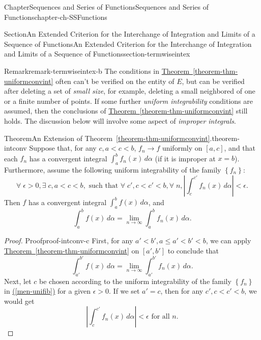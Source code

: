 \documentclass[oneside,10pt,]{book}
\newcommand{\xreffont}{\relax}
\numberwithin{equation}{section}
\begin{document}
\begin{chapterptx}{Chapter}{Sequences and Series of Functions}{}{Sequences and Series of Functions}{}{}{chapter-ch-SSFunctions}
\begin{sectionptx}{Section}{An Extended Criterion for the Interchange of Integration and Limits  of a Sequence of Functions}{}{An Extended Criterion for the Interchange of Integration and Limits  of a Sequence of Functions}{}{}{section-termwiseintex}
\begin{remark}{Remark}{}{remark-termwiseintex-b}%
The conditions in \hyperref[theorem-thm-uniformconvint]{Theorem~{\xreffont\ref{theorem-thm-uniformconvint}}} often can't be verified on the entity of \(E\), but can be verified after deleting a set of \emph{small size}, for example, deleting a small neighbored of one or a finite number of points. If some further \emph{uniform integrability} conditions are assumed, then the conclusions of \hyperref[theorem-thm-uniformconvint]{Theorem~{\xreffont\ref{theorem-thm-uniformconvint}}} still holds. The discussion below will involve some aspect of \emph{improper integrals}.%
\end{remark}
\begin{theorem}{Theorem}{An Extension of Theorem~{\xreffont\ref*{theorem-thm-uniformconvint}}.}{}{theorem-intconv}%
Suppose that, for any \(c, a < c < b\),  \(f_{n}\to f\) uniformly on \([a,c]\), and that each \(f_{n}\) has a convergent integral \(\int_{a}^{b} f_{n}(x)\, d\alpha\) (if it is improper at \(x=b\)). Furthermore, assume the following uniform integrability of the family \(\left\{f_{n}\right\}\):%
\begin{equation}
\forall \; \epsilon>0, \exists \; c, a < c < b, \text{ such that } \forall\; c', c < c' < b, \forall \; n, 
\left|\int_{c}^{c'} f_{n}(x)\, d\alpha \right| < \epsilon.\label{men-unifib}
\end{equation}
Then \(f\) has a convergent integral \(\int_{a}^{b} f(x)\, d\alpha\), and%
\begin{equation*}
\int_{a}^{b} f(x)\, d\alpha=\lim_{n\to \infty}\int_{a}^{b} f_{n}(x)\, d\alpha.
\end{equation*}
%
\end{theorem}
\begin{proof}{Proof}{}{proof-intconv-c}
First, for any \(a' < b', a \le a' < b' < b\), we can apply \hyperref[theorem-thm-uniformconvint]{Theorem~{\xreffont\ref{theorem-thm-uniformconvint}}} on \([a', b']\) to conclude that%
\begin{equation*}
\int_{a'}^{b'} f(x)\, d\alpha=\lim_{n\to \infty}\int_{a'}^{b'} f_{n}(x)\, d\alpha.
\end{equation*}
Next, let \(c\) be chosen according to the uniform integrability of the family \(\left\{f_{n}\right\}\) in \hyperref[men-unifib]{({\xreffont\ref{men-unifib}})} for a given \(\epsilon>0\). If we set \(a'=c\), then for any \(c', c < c' < b\), we would get%
\begin{equation*}
\left|\int_{c}^{c'} f_{n}(x)\, d\alpha \right| < \epsilon \text{ for all } n.

\end{equation*}
\end{proof}
\end{sectionptx}
\end{chapterptx}
\end{document}
